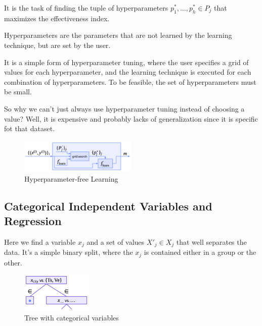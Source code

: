 \begin{definitionblock}
    It is the task of finding the tuple of hyperparameters $p^*_1, \dots, p^*_h \in P_j$ that maximizes the effectiveness index.
\end{definitionblock}

Hyperparameters are the parameters that are not learned by the learning technique, but are set by the user.

\begin{exampleblock}
    It is a simple form of hyperparameter tuning, where the user specifies a grid of values for each hyperparameter, and the learning technique is executed for each combination of hyperparameters. To be feasible, the set of hyperparameters must be small.
\end{exampleblock}

So why we can't just always use hyperparameter tuning instead of choosing a value? Well, it is expensive and probably lacks of generalization since it is specific fot that dataset.

\begin{center}
    \begin{figure}[H]
        \centering 
        \includegraphics[width=0.5\textwidth]{assets/fig18.png}
        \caption{Hyperparameter-free Learning}
    \end{figure}
\end{center}

\subsection{Categorical Independent Variables and Regression}

Here we find a variable $x_j$ and a set of values $X'_j \in X_j$ that well separates the data. It's a simple binary split, where the $x_j$ is contained either in a group or the other.

\begin{center}
    \begin{figure}[H]
        \centering 
        \includegraphics[width=0.3\textwidth]{assets/fig19.png}
        \caption{Tree with categorical variables}
    \end{figure}
\end{center}

